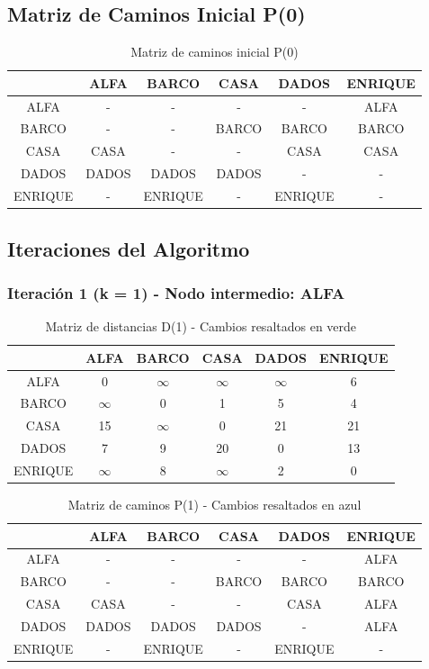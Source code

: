 \documentclass[12pt]{article}
\begin{document}
\subsection{Matriz de Caminos Inicial P(0)}
\begin{table}[h!]
\centering
\begin{tabular}{|c|c|c|c|c|c|}
\hline
 & ALFA & BARCO & CASA & DADOS & ENRIQUE \\\hline
ALFA & - & - & - & - & ALFA \\\hline
BARCO & - & - & BARCO & BARCO & BARCO \\\hline
CASA & CASA & - & - & CASA & CASA \\\hline
DADOS & DADOS & DADOS & DADOS & - & - \\\hline
ENRIQUE & - & ENRIQUE & - & ENRIQUE & - \\\hline
\end{tabular}
\caption{Matriz de caminos inicial P(0)}
\end{table}

\clearpage
\subsection{Iteraciones del Algoritmo}
\subsubsection{Iteración 1 (k = 1) - Nodo intermedio: ALFA}
\begin{table}[h!]
\centering
\begin{tabular}{|c|c|c|c|c|c|}
\hline
 & ALFA & BARCO & CASA & DADOS & ENRIQUE \\\hline
ALFA & 0 & $\infty$ & $\infty$ & $\infty$ & 6 \\\hline
BARCO & $\infty$ & 0 & 1 & 5 & 4 \\\hline
CASA & 15 & $\infty$ & 0 & 21 & \cellcolor{lightgreen} 21 \\\hline
DADOS & 7 & 9 & 20 & 0 & \cellcolor{lightgreen} 13 \\\hline
ENRIQUE & $\infty$ & 8 & $\infty$ & 2 & 0 \\\hline
\end{tabular}
\caption{Matriz de distancias D(1) - Cambios resaltados en verde}
\end{table}

\begin{table}[h!]
\centering
\begin{tabular}{|c|c|c|c|c|c|}
\hline
 & ALFA & BARCO & CASA & DADOS & ENRIQUE \\\hline
ALFA & - & - & - & - & ALFA \\\hline
BARCO & - & - & BARCO & BARCO & BARCO \\\hline
CASA & CASA & - & - & CASA & \cellcolor{lightblue} ALFA \\\hline
DADOS & DADOS & DADOS & DADOS & - & \cellcolor{lightblue} ALFA \\\hline
ENRIQUE & - & ENRIQUE & - & ENRIQUE & - \\\hline
\end{tabular}
\caption{Matriz de caminos P(1) - Cambios resaltados en azul}
\end{table}
\end{document}
